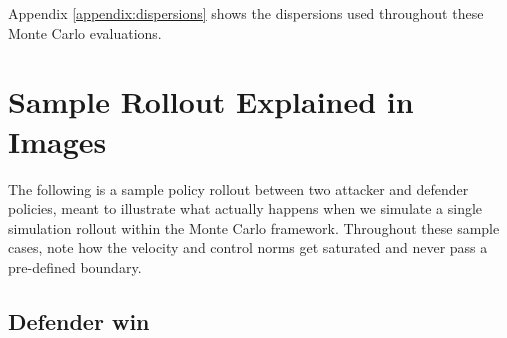Appendix \ref{appendix:dispersions} shows the dispersions used throughout these Monte Carlo evaluations.



\section{Sample Rollout Explained in Images}
\label{sec:sample-rollout-images}

The following is a sample policy rollout between two attacker and defender policies, meant to illustrate what actually happens when we simulate a single simulation rollout within the Monte Carlo framework. Throughout these sample cases, note how the velocity and control norms get saturated and never pass a pre-defined boundary.

\subsection{Defender win}
\label{subsec:defender-win}

